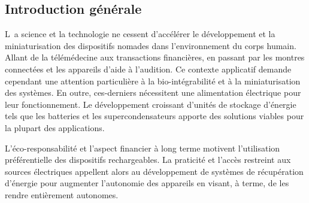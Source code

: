 
{}

\vspace*{-1cm}
\begin{flushright}
\section*{\fontsize{24pt}{24pt}\selectfont\textnormal{Introduction générale}}
\end{flushright}
\vspace{2cm}

      
\chead[\fancyplain{}{}]
      {\fancyplain{}{}}
\lfoot[\fancyplain{}{}]%
      {\fancyplain{}{}}
\cfoot[\fancyplain{}{\thepage}]
      {\fancyplain{}{\thepage}}
\rfoot[\fancyplain{}{}]%
     {\fancyplain{}{\scriptsize}}


\lettrine[lines=1]{L~}{}a science et la technologie ne cessent d'accélérer le développement et la miniaturisation des dispositifs nomades dans l'environnement du corps humain. Allant de la télémédecine aux transactions financières, en passant par les montres connectées et les appareils d'aide à l'audition. Ce contexte applicatif demande cependant une attention particulière à la bio-intégrabilité et à la miniaturisation des systèmes. En outre, ces-derniers nécessitent une alimentation électrique pour leur fonctionnement. Le développement croissant d'unités de stockage d'énergie tels que les batteries et les supercondensateurs apporte des solutions viables pour la plupart des applications.

L'éco-responsabilité et l'aspect financier à long terme motivent l'utilisation préférentielle des dispositifs rechargeables. La praticité et l'accès restreint aux sources électriques appellent alors au développement de systèmes de récupération d'énergie pour augmenter l'autonomie des appareils en visant, à terme, de les rendre entièrement autonomes.

